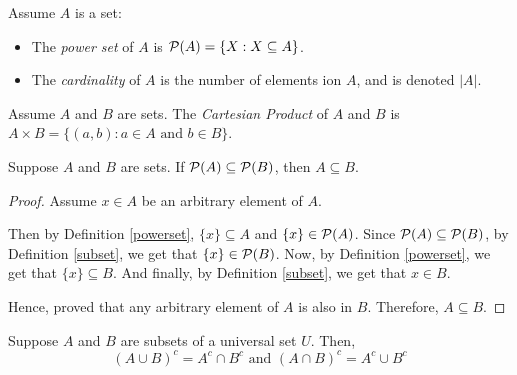 \begin{definition}\label{powerset}\label{cardinality}
	Assume $A$ is a set:
	\begin{itemize}
		\item The \emph{power set} of $A$ is $\mathcal{P}(A) = \{ X : X \subseteq A \}$.
		\item The \emph{cardinality} of $A$ is the number of elements ion $A$, and is denoted $|A|$.
	\end{itemize}
\end{definition}


\begin{definition}\label{cartesian}
	Assume $A$ and $B$ are sets. The \emph{Cartesian Product} of $A$ and $B$ is $A \times B = \{(a, b) : a \in A \text{ and } b \in B \}$.
\end{definition}

\begin{proposition}
	Suppose $A$ and $B$ are sets. If $\mathcal{P}(A) \subseteq \mathcal{P}(B)$, then $A \subseteq B$.
\end{proposition}
\begin{proof}
	Assume $x \in A$ be an arbitrary element of $A$.

	Then by Definition \ref{powerset}, $\{ x \} \subseteq A$ and $\{ x \} \in \mathcal{P}(A)$. 
	Since $\mathcal{P}(A) \subseteq \mathcal{P}(B)$, by Definition \ref{subset}, we get that $\{ x \} \in \mathcal{P}(B)$. 
	Now, by Definition \ref{powerset}, we get that $\{ x \} \subseteq B$.
	And finally, by Definition \ref{subset}, we get that $x \in B$.

	Hence, proved that any arbitrary element of $A$ is also in $B$. Therefore, $A \subseteq B$.
\end{proof}


\begin{theorem}\label{demorgan}
	Suppose $A$ and $B$ are subsets of a universal set $U$. Then, 
	$$(A \cup B)^c = A^c \cap B^c \text{ and } (A \cap B)^c = A^c \cup B^c$$
\end{theorem}

